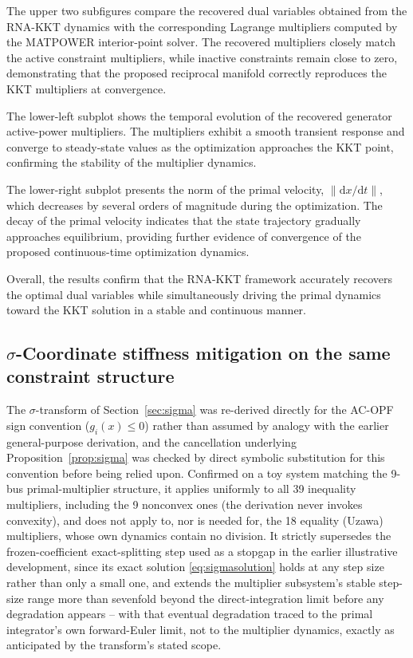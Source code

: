\documentclass[11pt,onecolumn]{article}
\theoremstyle{definition}
\theoremstyle{remark}
\begin{document}
The upper two subfigures compare the recovered dual variables obtained from the
RNA-KKT dynamics with the corresponding Lagrange multipliers computed by the
MATPOWER interior-point solver. The recovered multipliers closely match the
active constraint multipliers, while inactive constraints remain close to zero,
demonstrating that the proposed reciprocal manifold correctly reproduces the
KKT multipliers at convergence.

The lower-left subplot shows the temporal evolution of the recovered generator
active-power multipliers. The multipliers exhibit a smooth transient response
and converge to steady-state values as the optimization approaches the KKT
point, confirming the stability of the multiplier dynamics.

The lower-right subplot presents the norm of the primal velocity,
$\|\mathrm{d}x/\mathrm{d}t\|$, which decreases by several orders of magnitude
during the optimization. The decay of the primal velocity indicates that the
state trajectory gradually approaches equilibrium, providing further evidence
of convergence of the proposed continuous-time optimization dynamics.

Overall, the results confirm that the RNA-KKT framework accurately recovers the
optimal dual variables while simultaneously driving the primal dynamics toward
the KKT solution in a stable and continuous manner.





\subsection{$\sigma$-Coordinate stiffness mitigation on the same constraint structure}
The $\sigma$-transform of Section~\ref{sec:sigma} was re-derived directly for the AC-OPF sign
convention ($g_i(x) \le 0$) rather than assumed by analogy with the earlier general-purpose
derivation, and the cancellation underlying Proposition~\ref{prop:sigma} was checked by direct
symbolic substitution for this convention before being relied upon. Confirmed on a toy system
matching the 9-bus primal-multiplier structure, it applies uniformly to all 39 inequality
multipliers, including the 9 nonconvex ones (the derivation never invokes convexity), and does
not apply to, nor is needed for, the 18 equality (Uzawa) multipliers, whose own dynamics
contain no division. It strictly supersedes the frozen-coefficient exact-splitting step used as
a stopgap in the earlier illustrative development, since its exact solution
\eqref{eq:sigmasolution} holds at any step size rather than only a small one, and extends the
multiplier subsystem's stable step-size range more than sevenfold beyond the direct-integration
limit before any degradation appears -- with that eventual degradation traced to the primal
integrator's own forward-Euler limit, not to the multiplier dynamics, exactly as anticipated by
the transform's stated scope.
\end{document}
